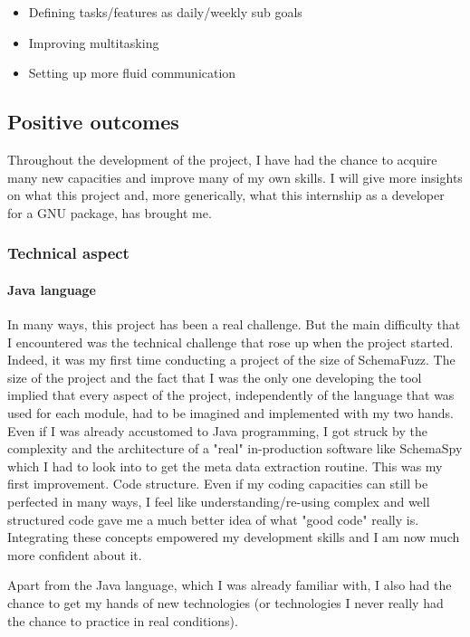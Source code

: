 	\begin{itemize}
	\item{Defining tasks/features as daily/weekly sub goals}
	\item{Improving multitasking} %
	\item{Setting up more fluid communication}
	\end{itemize}		

	\subsection{Positive outcomes}
Throughout the development of the project, I have had the chance to acquire many new capacities and improve many of my own skills. I will give more insights on what this project and, more generically, what this internship as a developer for a GNU package, has brought me.

		\subsubsection{Technical aspect}
		
		\paragraph{Java language}
In many ways, this project has been a real challenge. But the main difficulty that I encountered was the technical challenge that rose up when the project started. Indeed, it was my first time conducting a project of the size of SchemaFuzz. The size of the project and the fact that I was the only one developing the tool implied that every aspect of the project, independently of the language that was used for each module, had to be imagined and implemented with my two hands.
Even if I was already accustomed to Java programming, I got struck by the complexity and the architecture of a "real" in-production software like SchemaSpy which I had to look into to get the meta data extraction routine.
This was my first improvement. Code structure. Even if my coding capacities can still be perfected in many ways, I feel like understanding/re-using complex and well structured code gave me a much better idea of what "good code" really is. Integrating these concepts empowered my development skills and I am now much more confident about it.

Apart from the Java language, which I was already familiar with, I also had the chance to get my hands of new technologies (or technologies I never really had the chance to practice in real conditions). 

